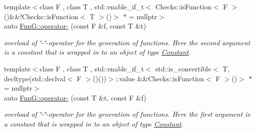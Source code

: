 \begin{DoxyCompactItemize}
{\footnotesize template$<$class F , class T , std\+::enable\+\_\+if\+\_\+t$<$ Checks\+::is\+Function$<$ F $>$()\&\&!\+Checks\+::is\+Function$<$ T $>$()$>$ $\ast$  = nullptr$>$ }\\auto \hyperlink{namespaceFunG_aa0c4552dee9179fb50b57ece863d835a}{Fun\+G\+::operator-\/} (const F \&f, const T \&t)
\begin{DoxyCompactList}\small\item\em overload of \char`\"{}-\/\char`\"{}-\/operator for the generation of functions. Here the second argument is a constant that is wrapped in to an object of type \hyperlink{structFunG_1_1Constant}{Constant}. \end{DoxyCompactList}\item 
{\footnotesize template$<$class F , class T , std\+::enable\+\_\+if\+\_\+t$<$ std\+::is\+\_\+convertible$<$ T, decltype(std\+::declval$<$ F $>$()())$>$\+::value \&\&\+Checks\+::is\+Function$<$ F $>$()$>$ $\ast$  = nullptr$>$ }\\auto \hyperlink{namespaceFunG_a7f522d98a8d5bc8c3b11599d3136ded4}{Fun\+G\+::operator-\/} (const T \&t, const F \&f)
\begin{DoxyCompactList}\small\item\em overload of \char`\"{}-\/\char`\"{}-\/operator for the generation of functions. Here the first argument is a constant that is wrapped in to an object of type \hyperlink{structFunG_1_1Constant}{Constant}. \end{DoxyCompactList}\end{DoxyCompactItemize}
